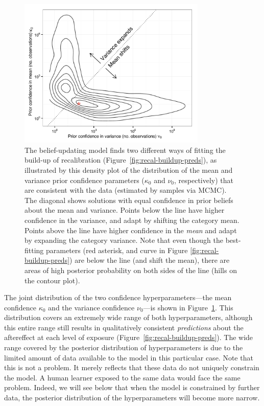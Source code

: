 \begin{figure}[!htb]
  \centering
  \includegraphics[width=0.8\textwidth]{figure/vroomen-recal-64-kappa-nu-joint-posterior-contour.pdf}
  \caption{The belief-updating model finds two different ways of fitting the build-up of recalibration (Figure~\ref{fig:recal-buildup-preds}), as illustrated by this density plot of the distribution of the mean and variance prior confidence parameters ($\kappa_0$ and $\nu_0$, respectively) that are consistent with the data (estimated by samples via MCMC).  The diagonal shows solutions with equal confidence in prior beliefs about the mean and variance.  Points below the line have higher confidence in the variance, and adapt by shifting the category mean.  Points above the line have higher confidence in the \emph{mean} and adapt by expanding the category variance.  Note that even though the best-fitting parameters (red asterisk, and curve in Figure \ref{fig:recal-buildup-preds}) are below the line (and shift the mean), there are areas of high posterior probability on both sides of the line (hills on the contour plot).} 
  \label{fig:vroomen-recal-joint-posterior}
\end{figure}

The joint distribution of the two confidence hyperparameters---the mean confidence $\kappa_0$ and the variance confidence $\nu_0$---is shown in Figure~\ref{fig:vroomen-recal-joint-posterior}.  This distribution covers an extremely wide range of both hyperparameters, although this entire range still results in qualitatively consistent \emph{predictions} about the aftereffect at each level of exposure (Figure~\ref{fig:recal-buildup-preds}).  The wide range covered by the posterior distribution of hyperparameters is due to the limited amount of data available to the model in this particular case. Note that this is not a problem. It merely reflects that these data do not uniquely constrain the model. A human learner exposed to the same data would face the same problem. Indeed, we will see below that when the model is constrained by further data, the posterior distribution of the hyperparameters will become more narrow.

